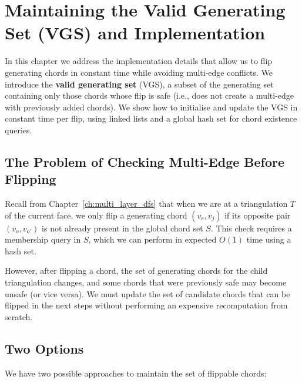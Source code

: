 
\chapter{Maintaining the Valid Generating Set (VGS) and Implementation}
\label{ch:vgs}

In this chapter we address the implementation details that allow us to flip generating chords in constant time while avoiding multi-edge conflicts. 
We introduce the \textbf{valid generating set} (VGS), a subset of the generating set containing only those chords whose flip is safe (i.e., does not create a multi-edge with previously added chords). 
We show how to initialise and update the VGS in constant time per flip, using linked lists and a global hash set for chord existence queries.

\section{The Problem of Checking Multi-Edge Before Flipping}
\label{sec:vgs_problem}

Recall from Chapter~\ref{ch:multi_layer_dfs} that when we are at a triangulation \(T\) of the current face, we only flip a generating chord \((v_r, v_j)\) if its opposite pair \((v_o, v_{o'})\) is not already present in the global chord set \(S\). 
This check requires a membership query in \(S\), which we can perform in expected \(O(1)\) time using a hash set.

However, after flipping a chord, the set of generating chords for the child triangulation changes, and some chords that were previously safe may become unsafe (or vice versa). 
We must update the set of candidate chords that can be flipped in the next steps without performing an expensive recomputation from scratch.

\section{Two Options}
\label{sec:vgs_options}

We have two possible approaches to maintain the set of flippable chords:

